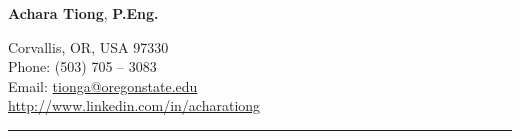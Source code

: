 \documentclass[10pt, letterpaper]{article}
\def\name{Achara Tiong}
\begin{document}
\selectfont

\begin{center}
	{{\LARGE \textbf{\name}}, \large\textbf{ P.Eng.}}
	
	\vspace{+0.5em}
	{%
	Corvallis, OR, USA 97330 \\
	Phone: (503) 705 -- 3083 \\
	\vspace{+0.3em}
	Email:} \href{mailto:tionga@oregonstate.edu}{tionga@oregonstate.edu} \\
	\href{http://www.linkedin.com/in/acharationg}{http://www.linkedin.com/in/acharationg}
\end{center}

\vspace{1em}
\hrule
\vspace{0.0em}
\thispagestyle{empty} %


\vspace{1.0em}
\end{document}
